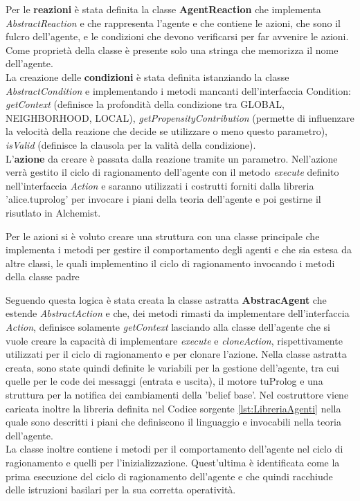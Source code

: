 \documentclass[12pt,a4paper,openright,twoside]{report}
\begin{document}
Per le \textbf{reazioni} \`e stata definita la classe \textbf{AgentReaction} che implementa \textit{AbstractReaction} e che rappresenta l'agente e che contiene le azioni, che sono il fulcro dell'agente, e le condizioni che devono verificarsi per far avvenire le azioni. Come propriet\`a della classe \`e presente solo una stringa che memorizza il nome dell'agente.
\\
La creazione delle \textbf{condizioni} \`e stata definita istanziando la classe \textit{AbstractCondition} e implementando i metodi mancanti dell'interfaccia Condition: \textit{getContext} (definisce la profondit\`a della condizione tra GLOBAL, NEIGHBORHOOD, LOCAL), \textit{getPropensityContribution} (permette di influenzare la velocit\`a della reazione che decide se utilizzare o meno questo parametro), \textit{isValid} (definisce la clausola per la valit\`a della condizione).
\\
L'\textbf{azione} da creare \`e passata dalla reazione tramite un parametro. Nell'azione verr\`a gestito il ciclo di ragionamento dell'agente con il metodo \textit{execute} definito nell'interfaccia \textit{Action} e saranno utilizzati i costrutti forniti dalla libreria 'alice.tuprolog' per invocare i piani della teoria dell'agente e poi gestirne il risutlato in Alchemist.

Per le azioni si \`e voluto creare una struttura con una classe principale che implementa i metodi per gestire il comportamento degli agenti e che sia estesa da altre classi, le quali implementino il ciclo di ragionamento invocando i metodi della classe padre

Seguendo questa logica \`e stata creata la classe astratta \textbf{AbstracAgent} che estende \textit{AbstractAction} e che, dei metodi rimasti da implementare dell'interfaccia \textit{Action}, definisce solamente \textit{getContext} lasciando alla classe dell'agente che si vuole creare la capacit\`a di implementare \textit{execute} e \textit{cloneAction}, rispettivamente utilizzati per il ciclo di ragionamento e per clonare l'azione.
Nella classe astratta creata, sono state quindi definite le variabili per la gestione dell'agente, tra cui quelle per le code dei messaggi (entrata e uscita), il motore tuProlog e una struttura per la notifica dei cambiamenti della 'belief base'. Nel costruttore viene caricata inoltre la libreria definita nel Codice sorgente \ref{lst:LibreriaAgenti} nella quale sono descritti i piani che definiscono il linguaggio e invocabili nella teoria dell'agente.
\\
La classe inoltre contiene i metodi per il comportamento dell'agente nel ciclo di ragionamento e quelli per l'inizializzazione. Quest'ultima \`e identificata come la prima esecuzione del ciclo di ragionamento dell'agente e che quindi racchiude delle istruzioni basilari per la sua corretta operativit\`a.
\end{document}

